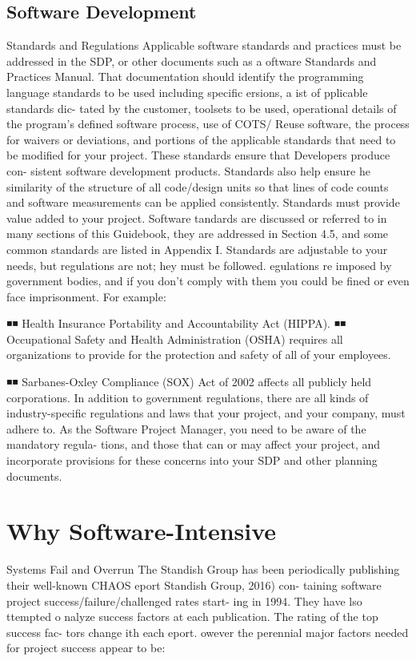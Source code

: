 \documentclass{book}
\begin{document}
\begin{multicols}{2}
\subsection{Software Development}
Standards and Regulations
Applicable software standards and practices must be
addressed in the SDP, or other documents such as a oftware
Standards and Practices Manual. That documentation should
identify the programming language standards to be used
including specific ersions, a ist of pplicable standards dic-
tated by the customer, toolsets to be used, operational details
of the program’s defined software process, use of COTS/
Reuse software, the process for waivers or deviations, and
portions of the applicable standards that need to be modified
for your project.
These standards ensure that Developers produce con-
sistent software development products. Standards also help
ensure he similarity of the structure of all code/design units
so that lines of code counts and software measurements can
be applied consistently. Standards must provide value added
to your project.
Software tandards are discussed or referred to in many
sections of this Guidebook, they are addressed in Section
4.5, and some common standards are listed in Appendix I.
Standards are adjustable to your needs, but regulations are
not; hey must be followed. egulations re imposed by
government bodies, and if you don’t comply with them you
could be fined or even face imprisonment. For example:


◾◾ Health Insurance Portability and Accountability Act
(HIPPA).
◾◾ Occupational Safety and Health Administration
(OSHA) requires all organizations to provide for the
protection and safety of all of your employees.

◾◾ Sarbanes-Oxley Compliance (SOX) Act of 2002 affects
all publicly held corporations.
In addition to government regulations, there are all kinds
of industry-specific regulations and laws that your project,
and your company, must adhere to. As the Software Project
Manager, you need to be aware of the mandatory regula-
tions, and those that can or may affect your project, and
incorporate provisions for these concerns into your SDP and
other planning documents.

\section{Why Software-Intensive}
Systems Fail and Overrun
The Standish Group has been periodically publishing their
well-known CHAOS eport Standish Group, 2016) con-
taining software project success/failure/challenged rates start-
ing in 1994. They have lso ttempted o nalyze success
factors at each publication. The rating of the top success fac-
tors change ith each eport. owever the perennial major
factors needed for project success appear to be:


\end{multicols}
\end{document}

